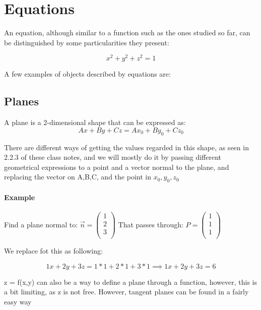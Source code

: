 \documentclass[11pt,fleqn]{book} %
\begin{document}
\section{Equations}

An equation, although similar to a function such as the ones studied so far,
can be distinguished by some particularities they present: 

$$ x^2 + y^2 + z^2 = 1$$

A few examples of objects described by equations are:

\subsection{Planes}

A plane is a 2-dimensional shape that can be expressed as:
\begin{equation}
    Ax + By + Cz = Ax_0 + By_0 + Cz_0
\end{equation}

There are different ways of getting the values regarded in this shape, as seen in 2.2.3 of these class notes, and we will mostly
do it by passing different geometrical expressions to a point and a vector normal to the plane, and replacing the vector 
on A,B,C, and the point in $ x_0, y_0, z_0 $

\paragraph{Example}

Find a plane normal to: $ \vec{n} = \begin{pmatrix}
    1 \\
    2 \\
    3 \\
\end{pmatrix} $
That passes through:
$ P = \begin{pmatrix}
    1 \\
    1 \\
    1 \\
\end{pmatrix} $

We replace fot this as following:

\begin{equation}
    1x + 2y + 3z = 1*1+2*1+3*1 \implies 1x + 2y + 3z = 6
\end{equation}

z = f(x,y) can also be a way to define a plane through a function, however, this is a bit 
limiting, as z is not free. However, tangent planes can be found in a fairly easy way
\end{document}
